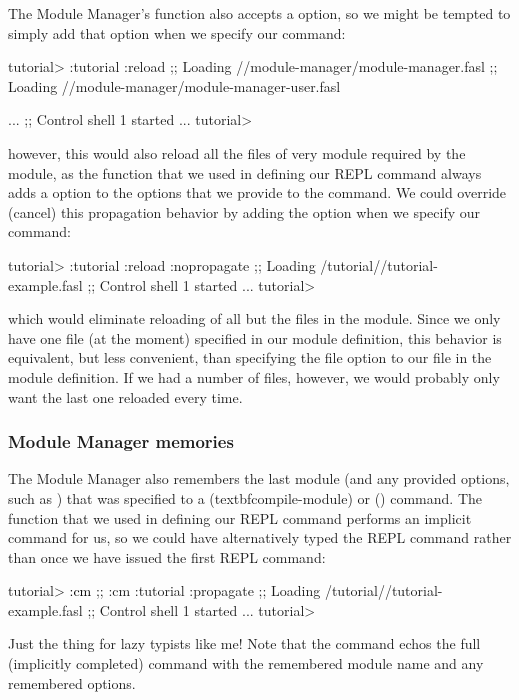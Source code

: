 \documentclass[10pt,twoside,english,pdftex]{article}
\begin{document}
The Module Manager's  function also accepts a
 option, so we might be tempted to simply add that option when
we specify our  command:
%
\W\supp
\begin{example}
\textcolor{darkergray}{%
  tutorial> :tutorial :reload
  ;;   Loading //module-manager/module-manager.fasl
  ;;     Loading
  //module-manager/module-manager-user.fasl

     ...
  ;; Control shell 1 started
     ...
  tutorial>}
\end{example}
%
however, this would also reload all the files of very module required by the
 module, as the  function that
we used in defining our  REPL command always adds a
 option to the options that we provide to the command.
We could override (cancel) this propagation behavior by adding the
 option when we specify our 
command:
%
\W\supp\notpretop
\begin{example}
\textcolor{darkergray}{%
  tutorial> :tutorial :reload :nopropagate
  ;; Loading /tutorial//tutorial-example.fasl
  ;; Control shell 1 started
     ...
  tutorial>}
\end{example}
%
which would eliminate reloading of all but the files in the 
module.  Since we only have one file (at the moment) specified in our
 module definition, this behavior is equivalent, but less
convenient, than specifying the  file option to our
 file in the module definition.  If we had a
number of files, however, we would probably only want the last one reloaded
every time.

\subsubsection*{Module Manager memories}

The Module Manager also remembers the last module (and any provided options,
such as ) that was specified to a 
(textbf{compile-module}) or  () command.
The  function that we used in defining our
 REPL command performs an implicit  command for us,
so we could have alternatively typed the  REPL command rather than
 once we have issued the first  REPL command:
%
\W\supp
\begin{example}
\textcolor{darkergray}{%
  tutorial> \textcolor{black}{:cm}
  ;; :cm :tutorial :propagate
  ;; Loading /tutorial//tutorial-example.fasl
  ;; Control shell 1 started
     ...
  tutorial>}
\end{example}
%
Just the thing for lazy typists like me!  Note that the  command
echos the full (implicitly completed) command with the remembered module name
and any remembered options.
\end{document}
